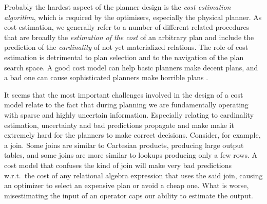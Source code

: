 
Probably the hardest aspect of the planner design is the \emph{cost
estimation algorithm}, which is required by the optimisers, especially
the physical planner.  As cost
estimation, we generally refer to a number of different related
procedures that are broadly the \emph{estimation of the cost} of an
arbitrary plan and include the prediction of the \emph{cardinality} of
not yet materialized relations. The role of cost estimation is
detrimental to plan selection and
to the navigation of the plan search space. A good cost model can help basic
planners make decent plans, and a bad one can cause sophisticated
planners make horrible plans \cite{leisHowGoodAre2015}.

It seems that the most important challenges involved in the design of
a cost model relate to the fact that during planning we are fundamentally operating
with sparse and highly uncertain information. Especially relating to
cardinality estimation, uncertainty and bad predictions propagate and
make make it extremely hard for the planners to make correct
decisions. Consider, for example, a join. Some joins are similar to
Cartesian products, producing large output tables, and some joins are
more similar to lookups producing only a few rows. A cost model that
confuses the kind of join will make very bad predictions w.r.t.\ the
cost of any relational algebra expression that uses the said join,
causing an optimizer to select an expensive plan or avoid a cheap
one. What is worse, misestimating the input of an operator caps our
ability to estimate the output.

